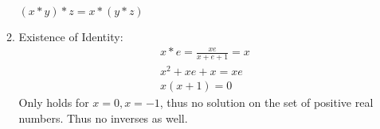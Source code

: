 \documentclass[nohyper,nobib]{tufte-handout}
\theoremstyle{definition}
\theoremstyle{remark}
\begin{document}
\begin{enumerate}
\begin{enumerate}[i]
\begin{align}
                \end{align}
                $(x * y) * z = x * (y * z)$
            \item Existence of Identity:
                \begin{align}
                    &x * e = \frac{xe}{x + e + 1}  = x \nonumber \\
                    & x^2 + xe + x = xe \nonumber  \\
                    & x(x + 1) =0
                \end{align}
            Only holds for $x=0, x=-1$, thus no solution on the set of positive real numbers. Thus no inverses as well.
        \end{enumerate}
\end{enumerate}
\end{document}
